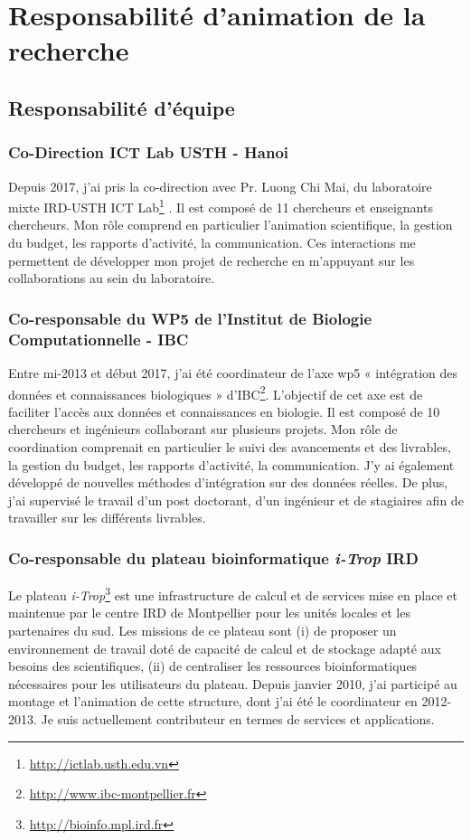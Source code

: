 \section{Responsabilité d'animation de la recherche}

\subsection*{Responsabilité d’équipe}
\subsubsection*{Co-Direction ICT Lab USTH - Hanoi} 
Depuis 2017, j’ai pris la co-direction avec Pr. Luong Chi Mai, du laboratoire mixte IRD-USTH ICT Lab\footnote{\url{http://ictlab.usth.edu.vn}} . Il est composé de 11 chercheurs et enseignants chercheurs. Mon rôle comprend en particulier l’animation scientifique, la gestion du budget, les rapports d’activité, la communication. Ces interactions me permettent de développer mon projet de recherche en m'appuyant sur les collaborations au sein du laboratoire.

\subsubsection*{Co-responsable du WP5 de l’Institut de Biologie Computationnelle - IBC} 
Entre mi-2013 et début 2017, j’ai été coordinateur de l’axe wp5 « intégration des données et connaissances biologiques » d'IBC\footnote{\url{http://www.ibc-montpellier.fr}}. L’objectif de cet axe est de faciliter l’accès aux données et connaissances en biologie. Il est composé de 10 chercheurs et ingénieurs collaborant sur plusieurs projets. Mon rôle de coordination comprenait en particulier le suivi des avancements et des livrables, la gestion du budget, les rapports d’activité, la communication. J’y ai également développé de nouvelles méthodes d’intégration sur des données réelles. De plus, j’ai supervisé le travail d’un post doctorant, d’un ingénieur et de stagiaires afin de travailler sur les différents livrables.  


\subsubsection*{Co-responsable du plateau bioinformatique \textit{i-Trop} IRD} 
Le plateau  \textit{i-Trop}\footnote{\url{http://bioinfo.mpl.ird.fr}} est une infrastructure de calcul et de services mise en place et maintenue par le centre IRD de Montpellier pour les unités locales et les partenaires du sud. Les missions de ce plateau sont (i) de proposer un environnement de travail doté de capacité de calcul et de stockage adapté aux besoins des scientifiques, (ii) de centraliser les ressources bioinformatiques nécessaires pour les utilisateurs du plateau. Depuis janvier 2010, j’ai participé au montage et l’animation de cette structure, dont j’ai été le coordinateur en 2012-2013. Je suis actuellement contributeur en termes de services et applications.


